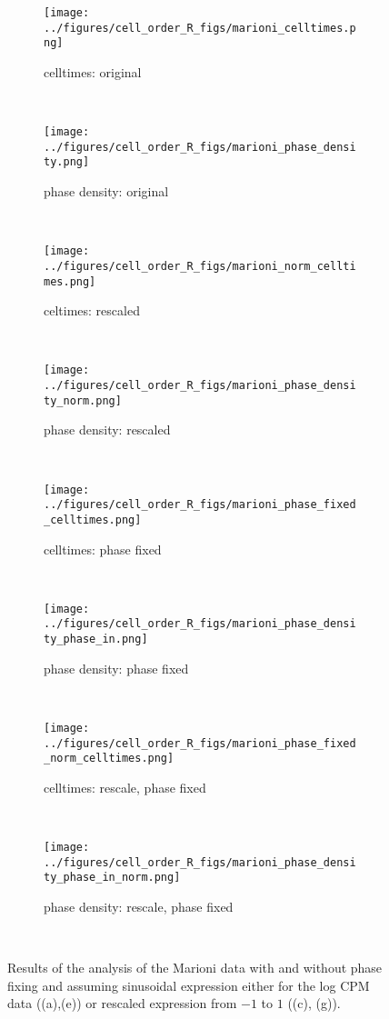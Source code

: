 \documentclass[11pt]{article}
\begin{document}
  \begin{figure*}[ht]
    \centering
     \begin{subfigure}[t]{0.5\textwidth}
        \centering
        \texttt{[image: ../figures/cell\_order\_R\_figs/marioni\_celltimes.png]}
        \caption{celltimes: original}
    \end{subfigure}%
    ~
    \begin{subfigure}[t]{0.5\textwidth}
        \centering
        \texttt{[image: ../figures/cell\_order\_R\_figs/marioni\_phase\_density.png]}
        \caption{phase density: original}
    \end{subfigure}\\

     \begin{subfigure}[t]{0.5\textwidth}
        \centering
        \texttt{[image: ../figures/cell\_order\_R\_figs/marioni\_norm\_celltimes.png]}
        \caption{celtimes: rescaled}
    \end{subfigure}%
    ~
       \begin{subfigure}[t]{0.5\textwidth}
        \centering
        \texttt{[image: ../figures/cell\_order\_R\_figs/marioni\_phase\_density\_norm.png]}
        \caption{phase density: rescaled}
    \end{subfigure}\\

       \begin{subfigure}[t]{0.5\textwidth}
        \centering
        \texttt{[image: ../figures/cell\_order\_R\_figs/marioni\_phase\_fixed\_celltimes.png]}
        \caption{celltimes: phase fixed}
    \end{subfigure}%
    ~
    \begin{subfigure}[t]{0.5\textwidth}
        \centering
        \texttt{[image: ../figures/cell\_order\_R\_figs/marioni\_phase\_density\_phase\_in.png]}
        \caption{phase density: phase fixed}
    \end{subfigure}\\

     \begin{subfigure}[t]{0.5\textwidth}
        \centering
        \texttt{[image: ../figures/cell\_order\_R\_figs/marioni\_phase\_fixed\_norm\_celltimes.png]}
        \caption{celltimes: rescale, phase fixed}
    \end{subfigure}%
    ~
       \begin{subfigure}[t]{0.5\textwidth}
        \centering
        \texttt{[image: ../figures/cell\_order\_R\_figs/marioni\_phase\_density\_phase\_in\_norm.png]}
        \caption{phase density: rescale, phase fixed}
    \end{subfigure}\\

    \caption{Results of the analysis of the Marioni data with and without phase fixing and assuming sinusoidal expression either for the log CPM data ((a),(e)) or rescaled expression from $-1$ to $1$ ((c), (g)).}
 \label{fig:fig10}
 \end{figure*}
\end{document}
